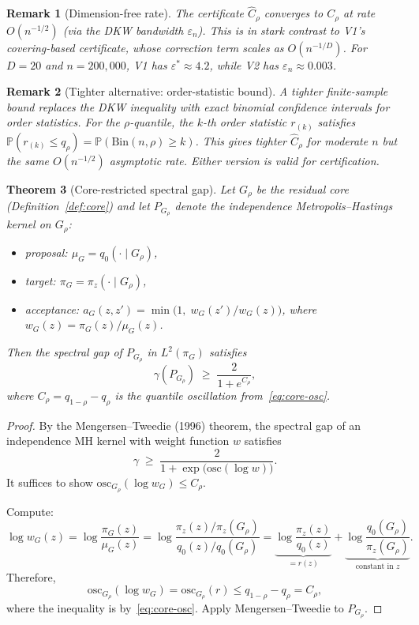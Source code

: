 \documentclass[11pt]{article}
\newtheorem{theorem}{Theorem}
\newtheorem{remark}[theorem]{Remark}
\newcommand{\Prob}{\mathbb{P}}
\newcommand{\osc}{\mathrm{osc}}
\begin{document}
\begin{remark}[Dimension-free rate]
The certificate $\hat{C}_\rho$ converges to $C_\rho$ at rate $O(n^{-1/2})$ (via the DKW bandwidth $\varepsilon_n$). This is in stark contrast to V1's covering-based certificate, whose correction term scales as $O(n^{-1/D})$. For $D=20$ and $n=200{,}000$, V1 has $\varepsilon^* \approx 4.2$, while V2 has $\varepsilon_n \approx 0.003$.
\end{remark}

\begin{remark}[Tighter alternative: order-statistic bound]\label{rem:order-stat}
A tighter finite-sample bound replaces the DKW inequality with exact binomial confidence intervals for order statistics. For the $\rho$-quantile, the $k$-th order statistic $r_{(k)}$ satisfies $\Prob(r_{(k)} \le q_\rho) = \Prob(\mathrm{Bin}(n,\rho) \ge k)$. This gives tighter $\hat{C}_\rho$ for moderate $n$ but the same $O(n^{-1/2})$ asymptotic rate. Either version is valid for certification.
\end{remark}


\begin{theorem}[Core-restricted spectral gap]\label{thm:core-gap}
Let $G_\rho$ be the residual core (Definition~\ref{def:core}) and let $P_{G_\rho}$ denote the independence Metropolis--Hastings kernel on $G_\rho$:
\begin{itemize}[nosep]
  \item proposal: $\mu_G = q_0(\cdot \mid G_\rho)$,
  \item target: $\pi_G = \pi_z(\cdot \mid G_\rho)$,
  \item acceptance: $a_G(z,z') = \min\bigl(1,\; w_G(z')/w_G(z)\bigr)$, where $w_G(z) = \pi_G(z)/\mu_G(z)$.
\end{itemize}
Then the spectral gap of $P_{G_\rho}$ in $L^2(\pi_G)$ satisfies
\begin{equation}\label{eq:core-spectral-gap}
  \gamma(P_{G_\rho}) \;\ge\; \frac{2}{1 + e^{C_\rho}},
\end{equation}
where $C_\rho = q_{1-\rho} - q_\rho$ is the quantile oscillation from~\eqref{eq:core-osc}.
\end{theorem}

\begin{proof}[Proof]
By the Mengersen--Tweedie (1996) theorem, the spectral gap of an independence MH kernel with weight function $w$ satisfies
\[
  \gamma \;\ge\; \frac{2}{1 + \exp\!\bigl(\osc(\log w)\bigr)}.
\]
It suffices to show $\osc_{G_\rho}(\log w_G) \le C_\rho$.

Compute:
\[
  \log w_G(z) = \log \frac{\pi_G(z)}{\mu_G(z)}
  = \log \frac{\pi_z(z) / \pi_z(G_\rho)}{q_0(z) / q_0(G_\rho)}
  = \underbrace{\log \frac{\pi_z(z)}{q_0(z)}}_{= r(z)} + \underbrace{\log \frac{q_0(G_\rho)}{\pi_z(G_\rho)}}_{\text{constant in } z}.
\]
Therefore,
\[
  \osc_{G_\rho}(\log w_G) = \osc_{G_\rho}(r) \le q_{1-\rho} - q_\rho = C_\rho,
\]
where the inequality is by~\eqref{eq:core-osc}. Apply Mengersen--Tweedie to $P_{G_\rho}$.
\end{proof}
\end{document}
